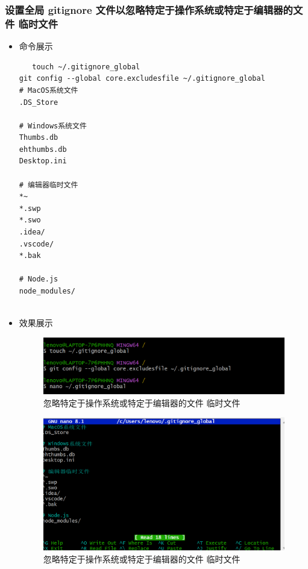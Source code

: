 \documentclass[UTF8]{ctexart}
\begin{document}
\subsubsection{设置全局 gitignore 文件以忽略特定于操作系统或特定于编辑器的文件 临时文件}
\begin{itemize}
  \item 命令展示
  \begin{verbatim}
   touch ~/.gitignore_global
git config --global core.excludesfile ~/.gitignore_global
# MacOS系统文件
.DS_Store

# Windows系统文件
Thumbs.db
ehthumbs.db
Desktop.ini

# 编辑器临时文件
*~
*.swp
*.swo
.idea/
.vscode/
*.bak

# Node.js
node_modules/


  \end{verbatim}

  \item 效果展示
  \begin{figure}[H]
    \centering
    \includegraphics[width=\textwidth]{n5} %
    \caption{忽略特定于操作系统或特定于编辑器的文件 临时文件}
    \label{fig:remote-branch-check}
  \end{figure}
  \begin{figure}[H]
    \centering
    \includegraphics[width=\textwidth]{n6} %
    \caption{忽略特定于操作系统或特定于编辑器的文件 临时文件}
    \label{fig:remote-branch-check}
  \end{figure}
\end{itemize}
\end{document}
